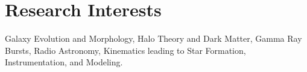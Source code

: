 \documentclass[a4paper,10pt]{article} %
\begin{document}
\section{Research Interests}

Galaxy Evolution and Morphology, Halo Theory and Dark Matter, Gamma Ray Bursts, Radio Astronomy, Kinematics leading to Star Formation, Instrumentation, and Modeling.



\newpage

\end{document}
